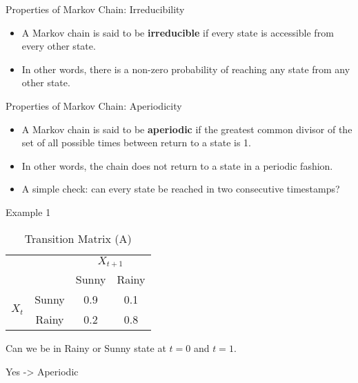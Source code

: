 \documentclass{beamer}
\begin{document}
\begin{frame}{Properties of Markov Chain: Irreducibility}
    \begin{itemize}
        \item A Markov chain is said to be \textbf{irreducible} if every state is accessible from every other state.
        \pause \item In other words, there is a non-zero probability of reaching any state from any other state.
    \end{itemize}

    
\end{frame}
\begin{frame}{Properties of Markov Chain: Aperiodicity}
    \begin{itemize}
        \item A Markov chain is said to be \textbf{aperiodic} if the greatest common divisor of the set of all possible times between return to a state is 1.
        \pause \item In other words, the chain does not return to a state in a periodic fashion.
        \pause \item A simple check: can every state be reached in two consecutive timestamps?
        
    \end{itemize}

    \pause Example 1

    \begin{table}[h]
      \centering
      \caption{Transition Matrix (A)}
      \begin{tabular}{cccc}
        \toprule
        & & \multicolumn{2}{c}{\(X_{t+1}\)} \\
        \cmidrule{3-4}
        & & Sunny & Rainy \\
        \midrule
        \multirow{2}{*}{\(X_t\)} & Sunny & 0.9 & 0.1 \\
        & Rainy & 0.2 & 0.8 \\
        \bottomrule
      \end{tabular}
    \end{table}

    \pause Can we be in Rainy or Sunny state at $t=0$ and $t=1$. 

    \pause Yes -> Aperiodic

  \end{frame}
\end{document}
